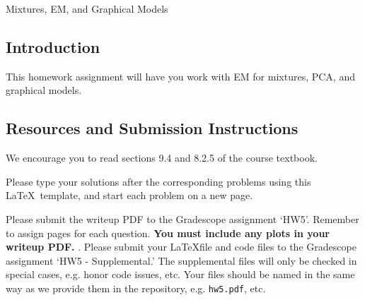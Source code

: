 \documentclass[submit]{../harvardml}
\begin{document}
\begin{center}
{\Large Mixtures, EM, and Graphical Models}\\
\end{center}



\subsection*{Introduction}

This homework assignment will have you work with EM for mixtures, PCA, and graphical models.

\subsection*{Resources and Submission Instructions}

We encourage you to read sections 9.4 and 8.2.5 of the course textbook.

Please type your solutions after the corresponding problems using this \LaTeX\ template, and start each problem on a new page.

Please submit the writeup PDF to the Gradescope assignment `HW5'. Remember to assign pages for each question.  \textbf{You must include any plots in your writeup PDF. }. Please submit your \LaTeX file and code files to the Gradescope assignment `HW5 - Supplemental.' The supplemental files will only be checked in special cases, e.g. honor code issues, etc. Your files should be named in the same way as we provide them in the repository, e.g. \texttt{hw5.pdf}, etc.
\end{document}
